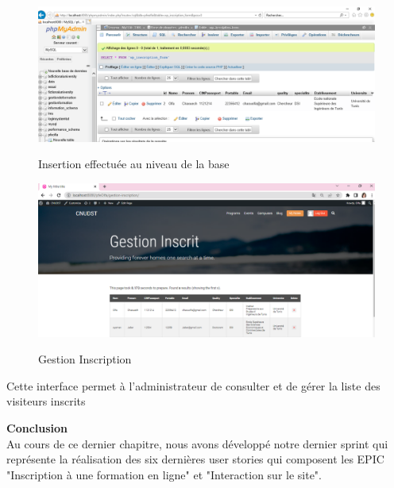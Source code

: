 \begin{itemize}
\begin{figure}[!h]
	\centering
	{\includegraphics[width= 1\textwidth]{D) IMAGES/db.png}}
	\caption{Insertion effectuée au niveau de la base}
	\label{Org}
\end{figure}
\newpage
\begin{figure}[!h]
	\centering
	{\includegraphics[width= 1\textwidth]{D) IMAGES/GestionInscrit.png}}
	\caption{Gestion Inscription}
	\label{Org}
\end{figure}
Cette interface permet à l'administrateur de consulter et de gérer la liste des visiteurs inscrits
\end{itemize} 
\textbf{Conclusion}\\
Au cours de ce dernier chapitre, nous avons développé notre dernier sprint qui représente la réalisation des six dernières user stories qui composent les EPIC "Inscription à une formation en ligne" et "Interaction sur le site".